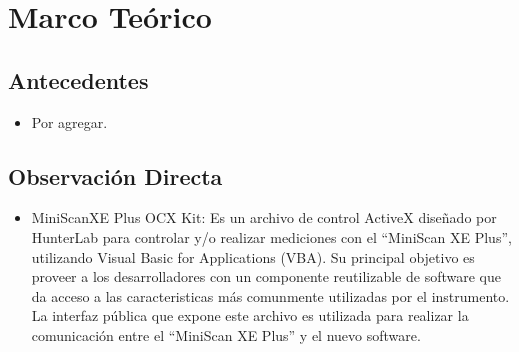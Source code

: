 \chapter{\label{cap:2}Marco Te\'{o}rico}

	\section{Antecedentes}	
		\begin{itemize}
			\item Por agregar.
		\end{itemize}

	\section{Observaci\'{o}n Directa}
		\begin{itemize}
			\item MiniScanXE Plus OCX Kit: Es un archivo de control ActiveX dise\~{n}ado por HunterLab para controlar y/o realizar mediciones con el ``MiniScan XE Plus'', utilizando Visual Basic for Applications (VBA). Su principal objetivo es proveer a los desarrolladores con un componente reutilizable de software que da acceso a las caracteristicas m\'{a}s comunmente utilizadas por el instrumento. La interfaz p\'{u}blica que expone este archivo es utilizada para realizar la comunicaci\'{o}n entre el ``MiniScan XE Plus'' y el nuevo software.
		\end{itemize}
